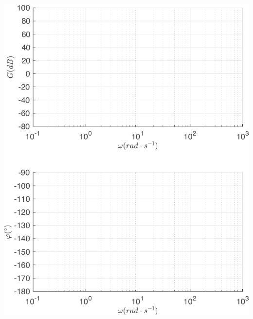 \documentclass[10pt,fleqn]{article} %
\begin{document}
\begin{multicols}{2}
\begin{center}
\includegraphics[width=1.0\linewidth]{images/matlab/bode_total0_pi.pdf}
\end{center}


\end{multicols}
\end{document}
